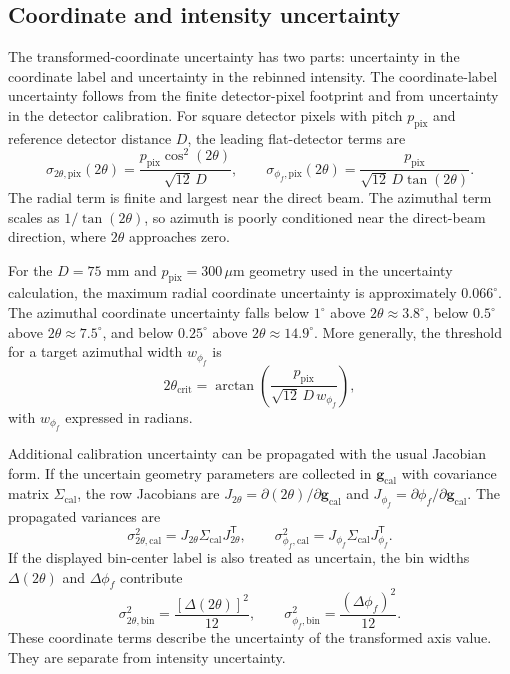 \subsection{Coordinate and intensity uncertainty}
\label{subsec:si_uncertainty}

The transformed-coordinate uncertainty has two parts: uncertainty in the coordinate label and uncertainty in the rebinned intensity. The coordinate-label uncertainty follows from the finite detector-pixel footprint and from uncertainty in the detector calibration. For square detector pixels with pitch $p_{\mathrm{pix}}$ and reference detector distance $D$, the leading flat-detector terms are
\begin{equation}
\sigma_{2\theta,\mathrm{pix}}(2\theta)=
\frac{p_{\mathrm{pix}}\cos^{2}(2\theta)}{\sqrt{12}\,D},
\qquad
\sigma_{\phi_f,\mathrm{pix}}(2\theta)=
\frac{p_{\mathrm{pix}}}{\sqrt{12}\,D\tan(2\theta)}.
\end{equation}
The radial term is finite and largest near the direct beam. The azimuthal term scales as $1/\tan(2\theta)$, so azimuth is poorly conditioned near the direct-beam direction, where $2\theta$ approaches zero.

For the $D=75$ mm and $p_{\mathrm{pix}}=300\,\mu\mathrm{m}$ geometry used in the uncertainty calculation, the maximum radial coordinate uncertainty is approximately $0.066^{\circ}$. The azimuthal coordinate uncertainty falls below $1^{\circ}$ above $2\theta\approx3.8^{\circ}$, below $0.5^{\circ}$ above $2\theta\approx7.5^{\circ}$, and below $0.25^{\circ}$ above $2\theta\approx14.9^{\circ}$. More generally, the threshold for a target azimuthal width $w_{\phi_f}$ is
\begin{equation}
2\theta_{\mathrm{crit}}=\arctan\!\left(\frac{p_{\mathrm{pix}}}{\sqrt{12}\,D\,w_{\phi_f}}\right),
\end{equation}
with $w_{\phi_f}$ expressed in radians.

Additional calibration uncertainty can be propagated with the usual Jacobian form. If the uncertain geometry parameters are collected in $\mathbf g_{\mathrm{cal}}$ with covariance matrix $\Sigma_{\mathrm{cal}}$, the row Jacobians are $J_{2\theta}=\partial(2\theta)/\partial\mathbf g_{\mathrm{cal}}$ and $J_{\phi_f}=\partial\phi_f/\partial\mathbf g_{\mathrm{cal}}$. The propagated variances are
\begin{equation}
\sigma^2_{2\theta,\mathrm{cal}}=
J_{2\theta}\Sigma_{\mathrm{cal}}J_{2\theta}^{\mathsf T},
\qquad
\sigma^2_{\phi_f,\mathrm{cal}}=
J_{\phi_f}\Sigma_{\mathrm{cal}}J_{\phi_f}^{\mathsf T}.
\end{equation}
If the displayed bin-center label is also treated as uncertain, the bin widths $\Delta(2\theta)$ and $\Delta\phi_f$ contribute
\begin{equation}
\sigma^2_{2\theta,\mathrm{bin}}=\frac{[\Delta(2\theta)]^2}{12},
\qquad
\sigma^2_{\phi_f,\mathrm{bin}}=\frac{(\Delta\phi_f)^2}{12}.
\end{equation}
These coordinate terms describe the uncertainty of the transformed axis value. They are separate from intensity uncertainty.


